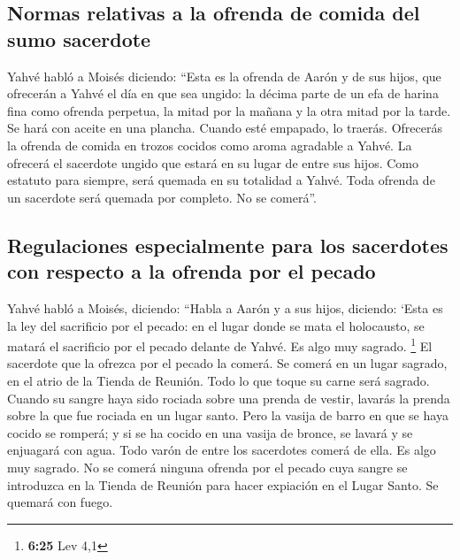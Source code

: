 \begin{paracol}{2}
\hypertarget{normas-relativas-a-la-ofrenda-de-comida-del-sumo-sacerdote}{%
\subsection{Normas relativas a la ofrenda de comida del sumo
sacerdote}\label{normas-relativas-a-la-ofrenda-de-comida-del-sumo-sacerdote}}

 Yahvé habló a Moisés diciendo:  ``Esta es
la ofrenda de Aarón y de sus hijos, que ofrecerán a Yahvé el día en que
sea ungido: la décima parte de un efa de harina fina como ofrenda
perpetua, la mitad por la mañana y la otra mitad por la tarde.
 Se hará con aceite en una plancha. Cuando esté empapado,
lo traerás. Ofrecerás la ofrenda de comida en trozos cocidos como aroma
agradable a Yahvé.  La ofrecerá el sacerdote ungido que
estará en su lugar de entre sus hijos. Como estatuto para siempre, será
quemada en su totalidad a Yahvé.  Toda ofrenda de un
sacerdote será quemada por completo. No se comerá''.

\hypertarget{regulaciones-especialmente-para-los-sacerdotes-con-respecto-a-la-ofrenda-por-el-pecado}{%
\subsection{Regulaciones especialmente para los sacerdotes con respecto
a la ofrenda por el
pecado}\label{regulaciones-especialmente-para-los-sacerdotes-con-respecto-a-la-ofrenda-por-el-pecado}}

 Yahvé habló a Moisés, diciendo:  ``Habla
a Aarón y a sus hijos, diciendo: `Esta es la ley del sacrificio por el
pecado: en el lugar donde se mata el holocausto, se matará el sacrificio
por el pecado delante de Yahvé. Es algo muy sagrado. \footnote{\textbf{6:25}
  Lev 4,1}  El sacerdote que la ofrezca por el pecado la
comerá. Se comerá en un lugar sagrado, en el atrio de la Tienda de
Reunión.  Todo lo que toque su carne será sagrado. Cuando
su sangre haya sido rociada sobre una prenda de vestir, lavarás la
prenda sobre la que fue rociada en un lugar santo.  Pero
la vasija de barro en que se haya cocido se romperá; y si se ha cocido
en una vasija de bronce, se lavará y se enjuagará con agua.
 Todo varón de entre los sacerdotes comerá de ella. Es
algo muy sagrado.  No se comerá ninguna ofrenda por el
pecado cuya sangre se introduzca en la Tienda de Reunión para hacer
expiación en el Lugar Santo. Se quemará con fuego.


\end{paracol}
